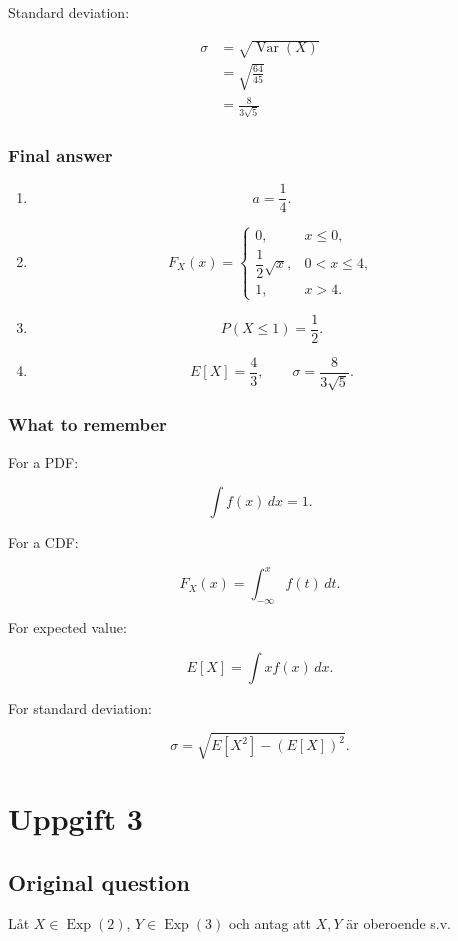 \documentclass[10pt]{article}
\begin{document}
Standard deviation:

\begin{align*}
\sigma
&=
\sqrt{\operatorname{Var}(X)} \\[2mm]
&=
\sqrt{\frac{64}{45}} \\[2mm]
&=
\frac{8}{3\sqrt{5}}
\end{align*}

\subsubsection*{Final answer}
\begin{enumerate}[label=\alph*)]
\item
\[
a=\frac{1}{4}.
\]

\item
\[
F_X(x)=
\begin{cases}
0,
& x\leq 0,\\
\dfrac{1}{2}\sqrt{x},
& 0<x\leq 4,\\
1,
& x>4.
\end{cases}
\]

\item
\[
P(X\leq 1)=\frac{1}{2}.
\]

\item
\[
E[X]=\frac{4}{3},
\qquad
\sigma=\frac{8}{3\sqrt{5}}.
\]
\end{enumerate}

\subsubsection*{What to remember}
For a PDF:

\[
\int f(x)\,dx=1.
\]

For a CDF:

\[
F_X(x)=\int_{-\infty}^{x} f(t)\,dt.
\]

For expected value:

\[
E[X]=\int x f(x)\,dx.
\]

For standard deviation:

\[
\sigma=
\sqrt{E[X^2]-(E[X])^2}.
\]

\section*{Uppgift 3}

\subsection*{Original question}
Låt \(X \in \operatorname{Exp}(2)\),
\(Y \in \operatorname{Exp}(3)\) och antag att
\(X, Y\) är oberoende s.v.
\end{document}
